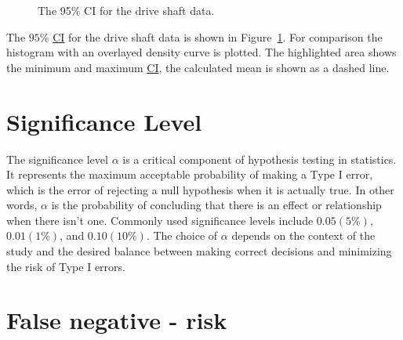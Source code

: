 \documentclass[
  a4paper,
]{scrbook}
\begin{document}
\begin{figure}[ht]


\caption{\label{fig-ci}The 95\% CI for the drive shaft data.}

\end{figure}%

The \(95\%\) \hyperref[acronyms_CI]{CI} for the drive shaft data is
shown in Figure~\ref{fig-ci}. For comparison the histogram with an
overlayed density curve is plotted. The highlighted area shows the
minimum and maximum \hyperref[acronyms_CI]{CI}, the calculated mean is
shown as a dashed line.

\section{Significance Level}\label{significance-level}

The significance level \(\alpha\) is a critical component of hypothesis
testing in statistics. It represents the maximum acceptable probability
of making a Type I error, which is the error of rejecting a null
hypothesis when it is actually true. In other words, \(\alpha\) is the
probability of concluding that there is an effect or relationship when
there isn't one. Commonly used significance levels include
\(0.05 (5\%)\), \(0.01 (1\%)\), and \(0.10 (10\%)\). The choice of
\(\alpha\) depends on the context of the study and the desired balance
between making correct decisions and minimizing the risk of Type I
errors.

\section{False negative - risk}\label{false-negative---risk}
\end{document}
